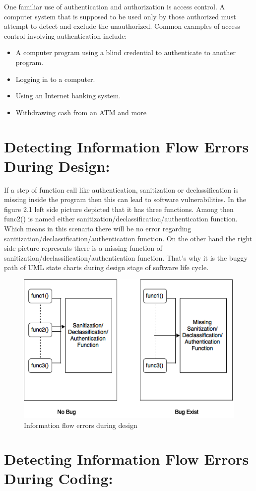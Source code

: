 One familiar use of authentication and authorization is access control. A computer system that is supposed to be used only by those authorized must attempt to detect and exclude the unauthorized. Common examples of access control involving authentication include:
\begin{itemize}	
	\item A computer program using a blind credential to authenticate to another program.
	\item Logging in to a computer.	
	\item Using an Internet banking system.
	\item Withdrawing cash from an ATM and more
\end{itemize}

\section{ Detecting Information Flow Errors During Design:}
If a step of function call like authentication, sanitization or declassification is missing inside the program then this can lead to software vulnerabilities. In the figure 2.1 left side picture depicted that it has three functions. Among then func2() is named either sanitization/declassification/authentication function. Which means in this scenario there will be no error regarding sanitization/declassification/authentication function. On the other hand the right side picture represents there is a missing function of sanitization/declassification/authentication function. That's why it is the buggy path of UML state charts during design stage of software life cycle. 
\begin{figure}[htbp]
	\centering
	\includegraphics{styles/FunctionCallMissing.png}
	\caption{Information flow errors during design}
\end{figure}


\section{ Detecting Information Flow Errors During Coding:}

